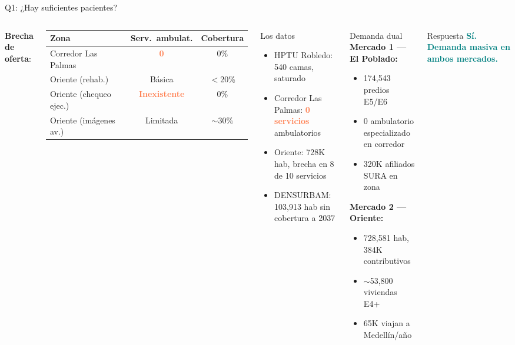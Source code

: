 \documentclass[aspectratio=169, 11pt]{beamer}
\newcommand{\highlight}[1]{\textcolor{teal}{\textbf{#1}}}
\newcommand{\danger}[1]{\textcolor{coral}{\textbf{#1}}}
\begin{document}
{
\begin{frame}{Q1: ¿Hay suficientes pacientes?}
\begin{columns}[T]
{\scriptsize\textbf{Brecha de oferta}:}

\vspace{2pt}
{\scriptsize
\begin{tabular}{@{}lcc@{}}
\toprule
\textbf{Zona} & \textbf{Serv.\ ambulat.} & \textbf{Cobertura} \\
\midrule
\rowcolor{coral!10}
Corredor Las Palmas & \danger{0} & 0\% \\
\rowcolor{coral!8}
Oriente (rehab.) & Básica & $<$20\% \\
\rowcolor{coral!8}
Oriente (chequeo ejec.) & \danger{Inexistente} & 0\% \\
\rowcolor{coral!8}
Oriente (imágenes av.) & Limitada & $\sim$30\% \\
\bottomrule
\end{tabular}
}

\vspace{2pt}
\begin{alertblock}{\small Los datos}
\scriptsize
\begin{itemize}\setlength{\itemsep}{0pt}
  \item HPTU Robledo: 540 camas, saturado
  \item Corredor Las Palmas: \danger{0 servicios} ambulatorios
  \item Oriente: 728K hab, brecha en 8 de 10 servicios
  \item DENSURBAM: 103,913 hab sin cobertura a 2037
\end{itemize}
\end{alertblock}

\begin{block}{\small Demanda dual}
\scriptsize
\textbf{Mercado 1 --- El Poblado:}
\begin{itemize}\setlength{\itemsep}{0pt}
  \item 174,543 predios E5/E6
  \item 0 ambulatorio especializado en corredor
  \item 320K afiliados SURA en zona
\end{itemize}

\vspace{2pt}
\textbf{Mercado 2 --- Oriente:}
\begin{itemize}\setlength{\itemsep}{0pt}
  \item 728,581 hab, 384K contributivos
  \item $\sim$53,800 viviendas E4+
  \item 65K viajan a Medellín/año
\end{itemize}
\end{block}

\vspace{2pt}
\begin{exampleblock}{\small Respuesta}
\centering\large
\highlight{Sí. Demanda masiva en ambos mercados.}
\end{exampleblock}
\end{columns}
\end{frame}
}
\end{document}
